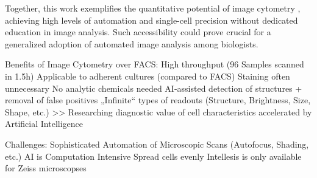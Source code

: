 Together, this work exemplifies the quantitative potential of image cytometry
\cite{guptaDeepLearningImage2019}, achieving high levels of automation and
single-cell precision without dedicated education in image analysis.
Such accessibility could prove crucial for a generalized adoption of automated
image analysis among biologists.

Benefits of Image Cytometry over FACS:
High throughput (96 Samples scanned in 1.5h)
Applicable to adherent cultures (compared to FACS) \cite{roukosCellCycleStaging2015}
Staining often unnecessary
No analytic chemicals needed
AI-assisted detection of structures + removal of false positives
„Infinite“ types of readouts (Structure, Brightness, Size, Shape, etc.)
>> Researching diagnostic value of cell characteristics accelerated by Artificial Intelligence

Challenges:
Sophisticated Automation of Microscopic Scans (Autofocus, Shading, etc.)
AI is Computation Intensive
Spread cells evenly
Intellesis is only available for Zeiss microscopses



%
\label{sec:discussion_quantifying_microscopy}%


